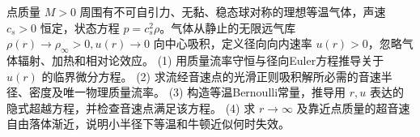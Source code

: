 点质量 \(M>0\) 周围有不可自引力、无黏、稳态球对称的理想等温气体，声速 \(c_s>0\) 恒定，状态方程 \(p=c_s^2\rho\)。气体从静止的无限远气库 \(\rho(r)\to\rho_\infty>0,u(r)\to0\) 向中心吸积，定义径向向内速率 \(u(r)>0\)，忽略气体辐射、加热和相对论效应。
(1) 用质量流率守恒与径向Euler方程推导关于 \(u(r)\) 的临界微分方程。
(2) 求流经音速点的光滑正则吸积解所必需的音速半径、密度及唯一物理质量流率。
(3) 构造等温Bernoulli常量，推导用 \(r,u\) 表达的隐式超越方程，并检查音速点满足该方程。
(4) 求 \(r\to\infty\) 及靠近点质量的超音速自由落体渐近，说明小半径下等温和牛顿近似何时失效。
